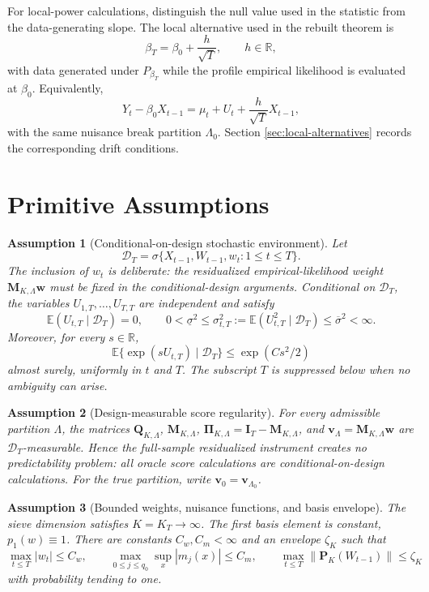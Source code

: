 \documentclass[12pt]{article}
\numberwithin{equation}{section}
\newtheorem{assumption}{Assumption}
\theoremstyle{definition}
\newcommand{\R}{\mathbb R}
\newcommand{\E}{\mathbb E}
\newcommand{\D}{\mathcal D}
\begin{document}
For local-power calculations, distinguish the null value used in the statistic from the data-generating slope. The local alternative used in the rebuilt theorem is
\[
    \beta_T=\beta_0+\frac{h}{\sqrt T},
    \qquad h\in\R,
\]
with data generated under \(P_{\beta_T}\) while the profile empirical likelihood is evaluated at \(\beta_0\). Equivalently,
\[
    Y_t-\beta_0X_{t-1}=\mu_t+U_t+\frac{h}{\sqrt T}X_{t-1},
\]
with the same nuisance break partition \(\Lambda_0\). Section \ref{sec:local-alternatives} records the corresponding drift conditions.

\section{Primitive Assumptions}

\begin{assumption}[Conditional-on-design stochastic environment]
\label{ass:prim-stoch}
Let
\[
    \D_T=\sigma\{X_{t-1},W_{t-1},w_t:1\leq t\leq T\}.
\]
The inclusion of \(w_t\) is deliberate: the residualized empirical-likelihood
weight \(\bm M_{K,\Lambda}\bm w\) must be fixed in the conditional-design
arguments.  Conditional on \(\D_T\), the variables
\(U_{1,T},\ldots,U_{T,T}\) are
independent and satisfy
\[
    \E(U_{t,T}\mid\D_T)=0,
    \qquad
    0<\underline\sigma^2\leq
    \sigma_{t,T}^2:=\E(U_{t,T}^2\mid\D_T)
    \leq\overline\sigma^2<\infty.
\]
Moreover, for every \(s\in\R\),
\[
    \E\{\exp(sU_{t,T})\mid\D_T\}
    \leq \exp(Cs^2/2)
\]
almost surely, uniformly in \(t\) and \(T\).  The subscript \(T\) is suppressed
below when no ambiguity can arise.
\end{assumption}

\begin{assumption}[Design-measurable score regularity]
\label{ass:prim-score-admissible}
For every admissible partition \(\Lambda\), the matrices \(\bm Q_{K,\Lambda}\),
\(\bm M_{K,\Lambda}\), \(\bm\Pi_{K,\Lambda}=\bm I_T-\bm M_{K,\Lambda}\), and
\(\bm v_\Lambda=\bm M_{K,\Lambda}\bm w\) are \(\D_T\)-measurable.  Hence the
full-sample residualized instrument creates no predictability problem: all
oracle score calculations are conditional-on-design calculations.  For the true
partition, write \(\bm v_0=\bm v_{\Lambda_0}\).
\end{assumption}

\begin{assumption}[Bounded weights, nuisance functions, and basis envelope]
\label{ass:prim-bounded}
The sieve dimension satisfies \(K=K_T\to\infty\). The first basis element is constant, \(p_1(w)\equiv1\). There are constants \(C_w,C_m<\infty\) and an envelope \(\zeta_K\) such that
\[
    \max_{t\leq T}|w_t|\leq C_w,
    \qquad
    \max_{0\leq j\leq q_0}\sup_x|m_j(x)|\leq C_m,
    \qquad
    \max_{t\leq T}\|\bm P_K(W_{t-1})\|\leq \zeta_K
\]
with probability tending to one.
\end{assumption}
\end{document}
